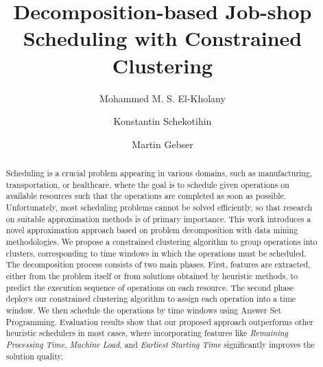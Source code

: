 \documentclass[runningheads]{llncs}
\begin{document}
%
\title{Decomposition-based Job-shop Scheduling with Constrained Clustering}%
%
%
\author{Mohammed M. S. El-Kholany \and
Konstantin Schekotihin \and
Martin Gebser}
%
%
%
\maketitle              %
%
\begin{abstract}
Scheduling is a crucial problem appearing in various domains, such as manufacturing, transportation, or healthcare, where %
the goal is to schedule %
given operations on available resources such that the operations are completed as soon as possible. Unfortunately, most scheduling problems cannot be solved efficiently, %
so that research on suitable approximation methods is of primary importance.
%
This work introduces a novel approximation approach based on problem decomposition with data mining methodologies. We propose a constrained clustering algorithm to group operations into clusters, corresponding to time windows in which the operations must be scheduled. 
The decomposition process consists of two main phases. 
First, features are extracted, either from the problem itself or from solutions obtained by heuristic methods, to predict the execution sequence of operations on each resource.
The second phase %
deploys our constrained clustering algorithm to assign each operation into a time window. We then schedule the operations by time windows using Answer Set Programming. Evaluation results show that our proposed approach outperforms other heuristic schedulers in most cases, where incorporating features like \textit{Remaining Processing Time}, \textit{Machine Load}, and \textit{Earliest Starting Time} significantly improves the solution quality.

\end{abstract}
%
%
%
\end{document}
